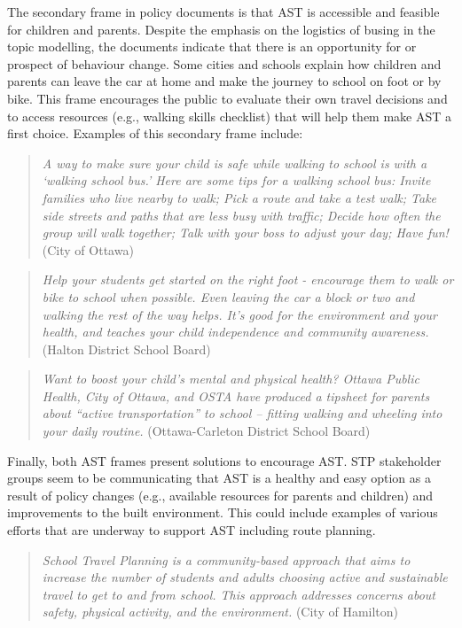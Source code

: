 \documentclass[]{elsarticle} %
\begin{document}
The secondary frame in policy documents is that AST is accessible and
feasible for children and parents. Despite the emphasis on the logistics
of busing in the topic modelling, the documents indicate that there is
an opportunity for or prospect of behaviour change. Some cities and
schools explain how children and parents can leave the car at home and
make the journey to school on foot or by bike. This frame encourages the
public to evaluate their own travel decisions and to access resources
(e.g., walking skills checklist) that will help them make AST a first
choice. Examples of this secondary frame include:

\begin{quote}
\emph{A way to make sure your child is safe while walking to school is
with a `walking school bus.' Here are some tips for a walking school
bus: Invite families who live nearby to walk; Pick a route and take a
test walk; Take side streets and paths that are less busy with traffic;
Decide how often the group will walk together; Talk with your boss to
adjust your day; Have fun!} (City of Ottawa)
\end{quote}

\begin{quote}
\emph{Help your students get started on the right foot - encourage them
to walk or bike to school when possible. Even leaving the car a block or
two and walking the rest of the way helps. It's good for the environment
and your health, and teaches your child independence and community
awareness.} (Halton District School Board)
\end{quote}

\begin{quote}
\emph{Want to boost your child's mental and physical health? Ottawa
Public Health, City of Ottawa, and OSTA have produced a tipsheet for
parents about ``active transportation'' to school -- fitting walking and
wheeling into your daily routine.} (Ottawa-Carleton District School
Board)
\end{quote}

Finally, both AST frames present solutions to encourage AST. STP
stakeholder groups seem to be communicating that AST is a healthy and
easy option as a result of policy changes (e.g., available resources for
parents and children) and improvements to the built environment. This
could include examples of various efforts that are underway to support
AST including route planning.

\begin{quote}
\emph{School Travel Planning is a community-based approach that aims to
increase the number of students and adults choosing active and
sustainable travel to get to and from school. This approach addresses
concerns about safety, physical activity, and the environment.} (City of
Hamilton)
\end{quote}
\end{document}

